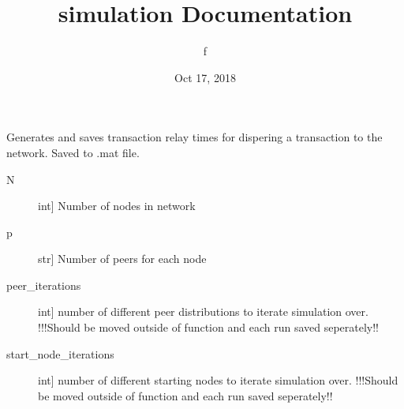 \documentclass[letterpaper,10pt,english]{sphinxmanual}
\title{simulation Documentation}
\date{Oct 17, 2018}
\author{f}
\begin{document}
\pagestyle{empty}
\maketitle
\pagestyle{plain}
\sphinxtableofcontents
\pagestyle{normal}
\label{\detokenize{index::doc}}

\label{\detokenize{index:module-propagation_time}}

\begin{fulllineitems}
\label{\detokenize{index:propagation_time.generate_transaction_time_distribution}}
Generates and saves transaction relay times for dispering a transaction to the network. Saved to .mat file.
\begin{description}
\item[{N}] \leavevmode{[}int{]}
Number of nodes in network

\item[{p}] \leavevmode{[}str{]}
Number of peers for each node

\item[{peer\_iterations}] \leavevmode{[}int{]}
number of different peer distributions to iterate simulation over. !!!Should be moved outside of function and each run saved seperately!!

\item[{start\_node\_iterations}] \leavevmode{[}int{]}
number of different starting nodes to iterate simulation over. !!!Should be moved outside of function and each run saved seperately!!

\end{description}

\end{fulllineitems}

\end{document}
